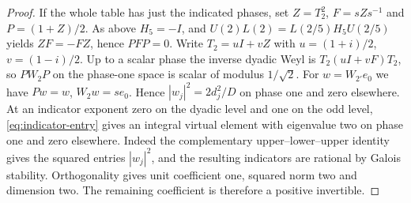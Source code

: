 \documentclass[11pt,a4paper]{article}
\numberwithin{equation}{section}
\theoremstyle{remark}
\begin{document}
\begin{proof}
If the whole table has just the indicated phases, set
$Z=T_2^2$, $F=sZs^{-1}$ and $P=(1+Z)/2$. As above $H_5=-I$,
and $U(2)L(2)=L(2/5)H_5U(2/5)$ yields $ZF=-FZ$, hence
$PFP=0$. Write $T_2=uI+vZ$ with $u=(1+i)/2$, $v=(1-i)/2$.
Up to a scalar phase the inverse dyadic Weyl is
$T_2(uI+vF)T_2$, so $PW_2P$ on the phase-one space is scalar
of modulus $1/\sqrt2$. For $w=W_{2'}e_0$ we have $Pw=w$,
$W_2w=se_0$. Hence $|w_j|^2=2d_j^2/D$ on phase one and zero
elsewhere. At an indicator exponent zero on the dyadic level and
one on the odd level, \eqref{eq:indicator-entry} gives an integral
virtual element with eigenvalue two on phase one and zero elsewhere.
Indeed the complementary upper--lower--upper identity gives the
squared entries $|w_j|^2$, and the resulting indicators are rational
by Galois stability. Orthogonality gives unit coefficient one, squared
norm two and dimension two. The remaining coefficient is therefore
a positive invertible.
\end{proof}
\end{document}
